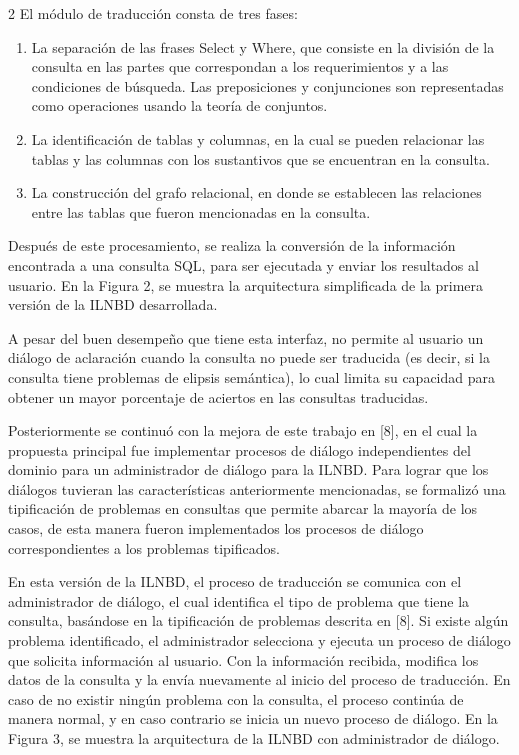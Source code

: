 \documentclass[letterpaper,10pt,final,hyphenatedtitles]{papertexKS}
\begin{document}
\begin{news}{2}
El módulo de traducción consta de tres fases:
\begin{enumerate}
\item La separación de las frases Select y Where, que consiste en la división de la consulta en las partes que correspondan a los requerimientos y a las condiciones de búsqueda. Las preposiciones y conjunciones son representadas como operaciones usando la teoría de conjuntos.
\item La identificación de tablas y columnas, en la cual se pueden relacionar las tablas y las columnas con los sustantivos que se encuentran en la consulta.
\item La construcción del grafo relacional, en donde se establecen las relaciones entre las tablas que fueron mencionadas en la consulta.
\end{enumerate}
Después de este procesamiento, se realiza la conversión de la información encontrada a una consulta SQL, para ser ejecutada y enviar los resultados al usuario. En la Figura 2, se muestra la arquitectura simplificada de la primera versión de la ILNBD desarrollada.
\begin{center}
\end{center}
A pesar del buen desempeño que tiene esta interfaz, no permite al usuario un diálogo de aclaración cuando la consulta no puede ser traducida (es decir, si la consulta tiene problemas de elipsis semántica), lo cual limita su capacidad para obtener un mayor porcentaje de aciertos en las consultas traducidas.

Posteriormente se continuó con la mejora de este trabajo en [8], en el cual la propuesta principal fue implementar procesos de diálogo independientes del dominio para un administrador de diálogo para la ILNBD. Para lograr que los diálogos tuvieran las características anteriormente mencionadas, se formalizó una tipificación de problemas en consultas que permite abarcar la mayoría de los casos, de esta manera fueron implementados los procesos de diálogo correspondientes a los problemas tipificados.
\begin{center}
\end{center}
En esta versión de la ILNBD, el proceso de traducción se comunica con el administrador de diálogo, el cual identifica el tipo de problema que tiene la consulta, basándose en la tipificación de problemas descrita en [8]. Si existe algún problema identificado, el administrador selecciona y ejecuta un proceso de diálogo que solicita información al usuario. Con la información recibida, modifica los datos de la consulta y la envía nuevamente al inicio del proceso de traducción. En caso de no existir ningún problema con la consulta, el proceso continúa de manera normal, y en caso contrario se inicia un nuevo proceso de diálogo. En la Figura 3, se muestra la arquitectura de la ILNBD con administrador de diálogo.
	

\end{news}
\end{document}
